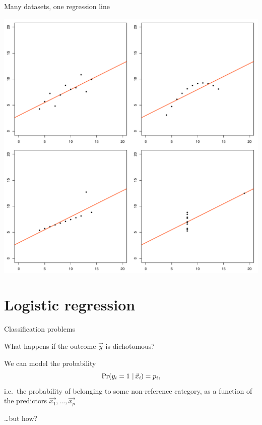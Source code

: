 \begin{frame}{Many datasets, one regression line}
    \begin{center}
        \includegraphics[height=0.8\textheight]{figures/anscombe}
    \end{center}
\end{frame}

\section{Logistic regression}

\begin{frame}{Classification problems}
    \begin{center}
        What happens if the outcome $\vec{y}$ is dichotomous?
    \end{center}
    \vfill\pause
    We can model the \alert{probability}
    \[
        \Pr\!\left( y_{i} = 1 \,\left|\,\vec{x}_{i} \right.\! \right) = p_{i}\text{,}
    \]
    i.e.\ the probability of belonging to some non\hyp{reference} category, as a
    function of the predictors $\vec{x_{1}}, \ldots, \vec{x_{p}}$
    \vfill
    \begin{flushright}
        \ldots but how?
    \end{flushright}
\end{frame}


